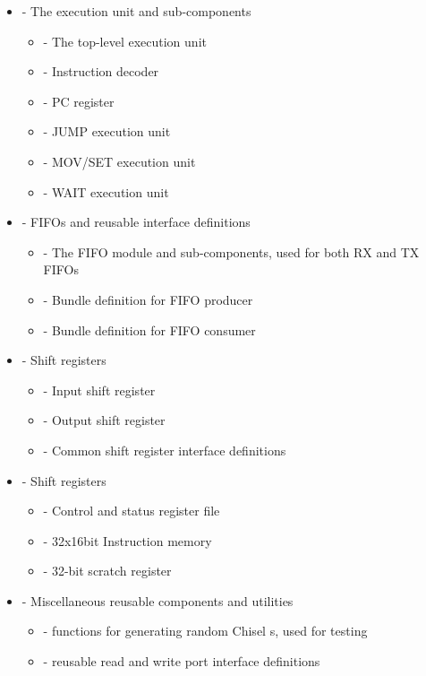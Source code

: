 \begin{itemize}
    \item {} - The execution unit and sub-components
          \begin{itemize}
              \item {} - The top-level execution unit
              \item {} - Instruction decoder
              \item {} - PC register
              \item {} - JUMP execution unit
              \item {} - MOV/SET execution unit
              \item {} - WAIT execution unit
          \end{itemize}
    \item {} - FIFOs and reusable interface definitions
          \begin{itemize}
              \item {} - The FIFO module and sub-components, used for both RX and TX FIFOs
              \item {} - Bundle definition for FIFO producer
              \item {} - Bundle definition for FIFO consumer
          \end{itemize}
    \item {} - Shift registers
          \begin{itemize}
              \item {} - Input shift register
              \item {} - Output shift register
              \item {} - Common shift register interface definitions
          \end{itemize}
    \item {} - Shift registers
          \begin{itemize}
              \item {} - Control and status register file
              \item {} - 32x16bit Instruction memory
              \item {} - 32-bit scratch register
          \end{itemize}
    \item {} - Miscellaneous reusable components and utilities
          \begin{itemize}
              \item {} - functions for generating random Chisel s, used for testing
              \item {} - reusable read and write port interface definitions
          \end{itemize}
\end{itemize}


